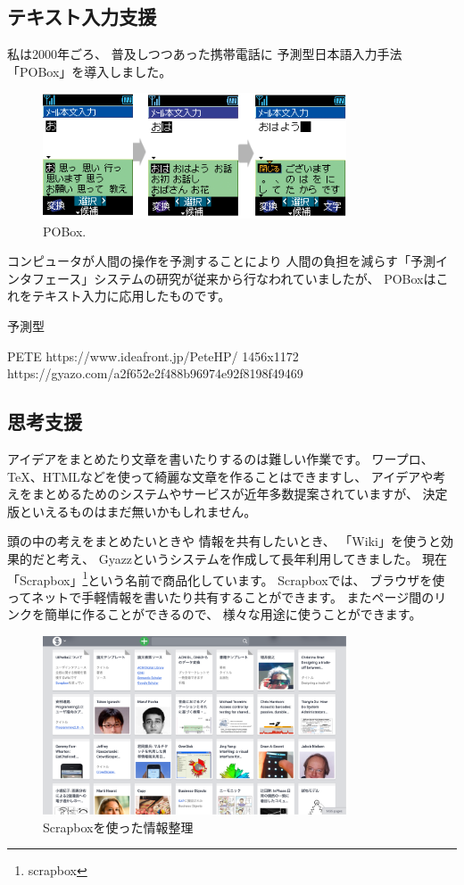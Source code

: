 \documentclass[topics]{compsoft} %
\begin{document}
\subsection{テキスト入力支援}

私は2000年ごろ、
普及しつつあった携帯電話に
予測型日本語入力手法「POBox」を導入しました。

\begin{figure}[!]
  \includegraphics[width=9cm,bb=0 0 404 600]{figures/ac2b347a7042f920edd576ee07c4b7f4.png}
  \caption{POBox.}
  \label{example1}
\end{figure}

コンピュータが人間の操作を予測することにより
人間の負担を減らす「予測インタフェース」システムの研究が従来から行なわれていましたが、
POBoxはこれをテキスト入力に応用したものです。

予測型

PETE
https://www.ideafront.jp/PeteHP/
1456x1172
https://gyazo.com/a2f652e2f488b96974e92f8198f49469



\subsection{思考支援}

アイデアをまとめたり文章を書いたりするのは難しい作業です。
ワープロ、{\TeX}、HTMLなどを使って綺麗な文章を作ることはできますし、
アイデアや考えをまとめるためのシステムやサービスが近年多数提案されていますが、
決定版といえるものはまだ無いかもしれません。

頭の中の考えをまとめたいときや
情報を共有したいとき、
「Wiki」を使うと効果的だと考え、
Gyazz\cite{gyazz}というシステムを作成して長年利用してきました。
現在「Scrapbox」\footnote{scrapbox}という名前で商品化しています。
Scrapboxでは、
ブラウザを使ってネットで手軽情報を書いたり共有することができます。
またページ間のリンクを簡単に作ることができるので、
様々な用途に使うことができます。

\begin{figure}[t]
  \includegraphics[width=9cm,bb=0 0 2607 1535]{figures/13982c755fdc0c60af2548c0a6589543.png}
  \caption{Scrapboxを使った情報整理}
  \label{example1}
\end{figure}
\end{document}

